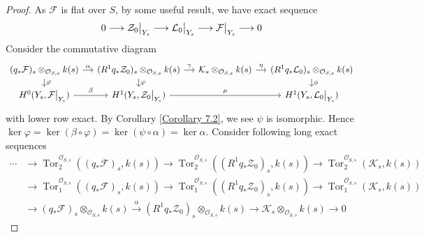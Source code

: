 \documentclass{ctexart}
\newcommand{\tor}{\operatorname{Tor}}
\begin{document}
\begin{proof}
    As $\mathcal{F}$ is flat over $S$, by some useful result, we have exact sequence
    \begin{equation}
        0 \longrightarrow \mathcal{Z}_{0}\big{|}_{Y_{s}} \longrightarrow \mathcal{L}_{0}\big{|}_{Y_{s}} \longrightarrow \mathcal{F}\big{|}_{Y_{s}} \longrightarrow 0
        \label{equation:exact_sequence_with_F_exact}
    \end{equation}
    Consider the commutative diagram
    \begin{equation*}
        \begin{tikzcd}[sep = small]
            (q_{\ast}\mathcal{F})_{s} \otimes_{\mathcal{O}_{S, s}} k(s) \arrow[r, "\alpha"] \arrow[d, "\varphi"] &
            (R^{1}q_{\ast}\mathcal{Z}_{0})_{s} \otimes_{\mathcal{O}_{S, s}} k(s) \arrow[r, "\gamma"] \arrow[d, "\psi"] &
            \mathcal{K}_{s} \otimes_{\mathcal{O}_{S, s}} k(s) \arrow[r, "\eta"] &
            (R^{1}q_{\ast}\mathcal{L}_{0})_{s} \otimes_{\mathcal{O}_{S, s}} k(s)  \arrow[d, "\phi"] \\
            H^{0}(Y_{s}, \mathcal{F}\big{|}_{Y_{s}}) \arrow[r, "\beta"] &
            H^{1}(Y_{s}, \mathcal{Z}_{0}\big{|}_{Y_{s}}) \arrow[rr, "\mu"] &&
            H^{1}(Y_{s}, \mathcal{L}_{0}\big{|}_{Y_{s}})
        \end{tikzcd}
    \end{equation*}
    with lower row exact.
    By Corollary \ref{Corollary 7.2}, we see $\psi$ is isomorphic.
    Hence $\ker \varphi = \ker (\beta \circ \varphi) = \ker (\psi \circ \alpha) = \ker \alpha$.
    Consider following long exact sequences
    \begin{equation}
        \begin{split}
            \cdots & \rightarrow \tor_{2}^{\mathcal{O}_{S, s}}((q_{\ast}\mathcal{F})_{s}, k(s)) \rightarrow \tor_{2}^{\mathcal{O}_{S, s}}((R^{1}q_{\ast}\mathcal{Z}_{0})_{s}, k(s)) \rightarrow \tor_{2}^{\mathcal{O}_{S, s}}(\mathcal{K}_{s}, k(s)) \\
            & \rightarrow \tor_{1}^{\mathcal{O}_{S, s}}((q_{\ast}\mathcal{F})_{s}, k(s)) \rightarrow \tor_{1}^{\mathcal{O}_{S, s}}((R^{1}q_{\ast}\mathcal{Z}_{0})_{s}, k(s)) \rightarrow \tor_{1}^{\mathcal{O}_{S, s}}(\mathcal{K}_{s}, k(s)) \\
            & \rightarrow (q_{\ast}\mathcal{F})_{s} \otimes_{\mathcal{O}_{S, s}} k(s) \overset{\alpha}{\rightarrow} (R^{1}q_{\ast}\mathcal{Z}_{0})_{s} \otimes_{\mathcal{O}_{S, s}} k(s) \rightarrow \mathcal{K}_{s} \otimes_{\mathcal{O}_{S, s}} k(s) \rightarrow 0

\end{split}
\end{equation}
\end{proof}
\end{document}
